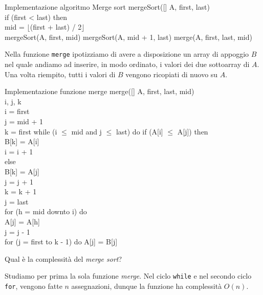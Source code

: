 \begin{code}{Implementazione algoritmo Merge sort}
\noindent\rmbreak\ind mergeSort([] A,  first,  last)\\
    if (first < last) then\\
        \indf{} mid = $\lfloor$(first + last) / 2$\rfloor$\\
        mergeSort(A, first, mid)\hfill{}
        mergeSort(A, mid + 1, last)\hfill{}
        merge(A, first, last, mid)\hfill{}
\end{code}\noindent
Nella funzione \texttt{merge} ipotizziamo di avere a disposizione un array di
appoggio $B$ nel quale andiamo ad inserire, in modo ordinato, i valori dei due
sottoarray di $A$. Una volta riempito, tutti i valori di $B$ vengono ricopiati
di nuovo su $A$.
\begin{code}{Implementazione funzione merge}
\noindent\rmbreak\ind merge([] A,  first,  last,  mid)\\
     i, j, k\\
    i = first\\
    j = mid + 1\\
    k = first\hfill{}
    while (i $\leq$ mid and j $\leq$ last) do\hfill{}
        \indf if (A[i] $\leq$ A[j]) then\\
            \indff B[k] = A[i]\\
            i = i + 1\\
        \indf else\\
            \indff B[k] = A[j]\\
            j = j + 1\\
        \indf k = k + 1\\
    \ind j = last\\
    for (h = mid downto i) do\\
        \indf A[j] = A[h]\\
        \indf j = j - 1\\
    \ind for (j = first to k - 1) do\hfill{}
        \indf A[j] = B[j]
\end{code}\noindent
Qual è la complessità del \emph{merge sort}?

\bigskip\noindent
Studiamo per prima la sola funzione \emph{merge}.
Nel ciclo \texttt{while} e nel secondo ciclo \texttt{for}, vengono fatte $n$
assegnazioni, dunque la funzione ha complessità $O(n)$.

